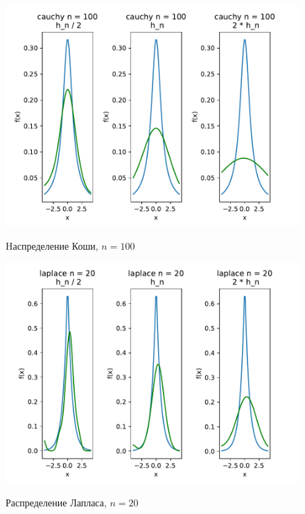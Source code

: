 \documentclass[a4paper]{article}
\begin{document}
\begin{figure}[H]
	\centering
	{\includegraphics[scale=0.5]{src_lab_4/kde_100_cauchy}}
		\caption{Hаспределение Коши, $n=100$}
		\label{fig:kde_cauchy_100}
	\end{figure}

\begin{figure}[H]
	\centering
	{\includegraphics[scale=0.5]{src_lab_4/kde_20_laplace}}
		\caption{Распределение Лапласа, $n=20$}
		\label{fig:kde_laplace_20}
	\end{figure}
\end{document}
